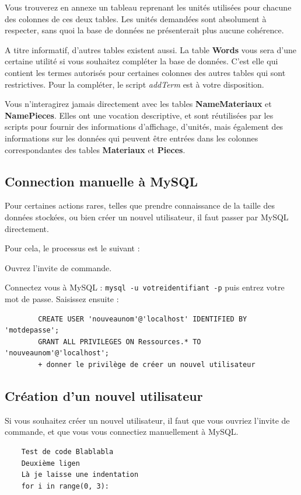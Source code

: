 \documentclass[12pt,a4paper]{article}
\begin{document}
    Vous trouverez en annexe un tableau reprenant les unités utilisées pour chacune des colonnes de ces deux tables.
    Les unités demandées sont absolument à respecter, sans quoi la base de données ne présenterait plus aucune cohérence.

    A titre informatif, d'autres tables existent aussi.
    La table \textbf{Words} vous sera d'une certaine utilité si vous souhaitez
    compléter la base de données. C'est elle qui contient les termes autorisés
    pour certaines colonnes des autres tables qui sont restrictives. Pour la
    compléter, le script \emph{addTerm} est à votre disposition.

    Vous n'interagirez jamais directement avec les tables \textbf{NameMateriaux}
    et \textbf{NamePieces}. Elles ont une vocation descriptive, et sont réutilisées
    par les scripts pour fournir des informations d'affichage, d'unités, mais également des
    informations sur les données qui peuvent être entrées dans les colonnes correspondantes
    des tables \textbf{Materiaux} et \textbf{Pieces}.


\subsection{Connection manuelle à MySQL}
    Pour certaines actions rares, telles que prendre connaissance de la taille des
    données stockées, ou bien créer un nouvel utilisateur, il faut passer
    par MySQL directement.

    Pour cela, le processus est le suivant : 
    
    Ouvrez l'invite de commande.

    Connectez vous à MySQL : \verb+mysql -u votreidentifiant -p+ puis entrez votre mot de passe.
    Saisissez ensuite :

    \begin{verbatim} 
        CREATE USER 'nouveaunom'@'localhost' IDENTIFIED BY 'motdepasse';
        GRANT ALL PRIVILEGES ON Ressources.* TO 'nouveaunom'@'localhost';
        + donner le privilège de créer un nouvel utilisateur        
    \end{verbatim} %


\subsection{Création d'un nouvel utilisateur}
    Si vous souhaitez créer un nouvel utilisateur, il faut que vous ouvriez l'invite de commande,
    et que vous vous connectiez manuellement à MySQL.

\begin{verbatim}
    Test de code Blablabla
    Deuxième ligen
    Là je laisse une indentation
    for i in range(0, 3):
\end{verbatim}
\end{document}
